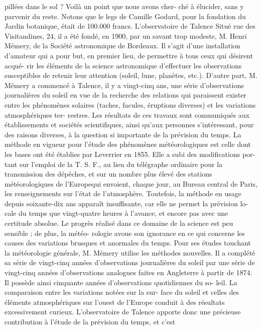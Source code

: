 \documentclass[a4paper,11pt]{book}
\begin{document}
pillées dans le sol ? Voilà un point que nous avons cher-
ché à élucider, sans y parvenir du reste.
Notons que le legs de Camille Godard, pour la fondation
du Jardin botanique, était de 100.000 francs.
L'observatoire de Talence
Situé rue des Visitandines, 24, il a été fondé, en 1900, par
un savant trop modeste, M. Henri Mémery, de la Société
astronomique de Bordeaux.
Il s'agit d'une installation d'amateur qui a pour but, en
premier lieu, de permettre à tous ceux qui désirent acqué-
rir les éléments de la science astronomique d'effectuer les
observations susceptibles de retenir leur attention (soleil,
lune, planètes, etc.).
D'autre part, M. Mémery a commencé à Talence, il y a
vingt-cinq ans, une série d'observations journalières du
soleil en vue de la recherche des relations qui paraissent
exister entre les phénomènes solaires (taches, facules,
éruptions diverses) et les variations atmosphériques ter-
restres. Les résultats de ces travaux sont communiqués
aux établissements et sociétés scientifiques, ainsi qu'aux
personnes s'intéressant, pour des raisons diverses, à la
question si importante de la prévision du temps.
La méthode en vigueur pour l'étude des phénomènes
météorologiques est celle dont les bases ont été établies
par Leverrier en 1855. Elle a subi des modifications por-
tant sur l'emploi de la T. S. F., au lieu du télégraphe
ordinaire pour la transmission des dépêches, et sur un
nombre plus élevé des stations météorologiques de l'Europequi envoient, chaque jour, au Bureau central de Paris,
les renseignements
sur l'état de l'atmosphère.
Toutefois, la méthode en usage depuis soixante-dix ans
apparaît insuffisante, car elle ne permet la prévision lo-
cale du temps que vingt-quatre heures à l'avance, et encore
pas avec une certitude absolue. Le progrès réalisé dans ce
domaine de la science est peu sensible ; de plus, la météo-
rologie avoue son ignorance en ce qui concerne les causes
des variations brusques et anormales du temps.
Pour ses études touchant la météorologie générale,
M. Mémery utilise les méthodes nouvelles. Il a complété sa
série de vingt-cinq années d'observations journalières du
soleil par une série de vingt-cinq années d'observations
analogues faites en Angleterre à partir de 1874. Il possède
ainsi cinquante années d'observations quotidiennes du so-
leil.
La comparaison entre les variations notées sur la sur-
face du soleil et celles des éléments atmosphériques sur
l'ouest de l'Europe conduit à des résultats excessivement
curieux.
L'observatoire de Talence apporte donc une précieuse
contribution à l'étude de la prévision du temps, et c'est
\end{document}
